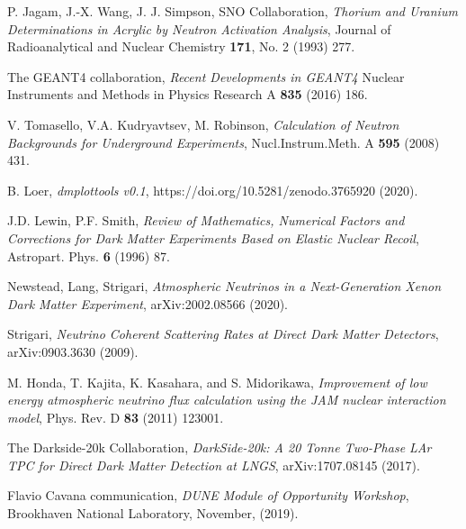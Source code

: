 \documentclass[a4paper,11pt]{article}
\begin{document}
\begin{thebibliography}{99}


P. Jagam, J.-X. Wang, J. J. Simpson, SNO Collaboration, 
\emph {Thorium and Uranium Determinations in Acrylic by Neutron Activation Analysis}, 
Journal of Radioanalytical and Nuclear Chemistry {\bf 171}, No. 2 (1993) 277.

The GEANT4 collaboration, \emph{Recent Developments in GEANT4} Nuclear Instruments and Methods in Physics Research A {\bf 835} (2016) 186.

V. Tomasello, V.A. Kudryavtsev, M. Robinson, 
\emph {Calculation of Neutron Backgrounds for Underground Experiments}, 
Nucl.Instrum.Meth. A {\bf 595} (2008) 431.

B. Loer, {\it dmplottools v0.1}, https://doi.org/10.5281/zenodo.3765920 (2020).


J.D. Lewin, P.F. Smith,
\emph {Review of Mathematics, Numerical Factors and Corrections for Dark Matter Experiments Based on Elastic Nuclear Recoil}, 
Astropart. Phys. {\bf 6} (1996) 87.

Newstead, Lang, Strigari,
{\it Atmospheric Neutrinos in a Next-Generation Xenon Dark Matter Experiment}, arXiv:2002.08566 (2020).

Strigari,
{\it Neutrino Coherent Scattering Rates at Direct Dark Matter Detectors}, arXiv:0903.3630   (2009).

M. Honda, T. Kajita, K. Kasahara, and S. Midorikawa,
{\it Improvement of low energy atmospheric neutrino flux calculation using the JAM nuclear interaction model}, 
Phys. Rev. D {\bf 83} (2011) 123001.

The Darkside-20k Collaboration, \emph{DarkSide-20k: A 20 Tonne Two-Phase LAr TPC for Direct Dark Matter Detection at LNGS},
 arXiv:1707.08145 (2017).

Flavio Cavana communication, \emph{DUNE Module of Opportunity Workshop}, Brookhaven National Laboratory, November, (2019).


\end{thebibliography}
\end{document}

